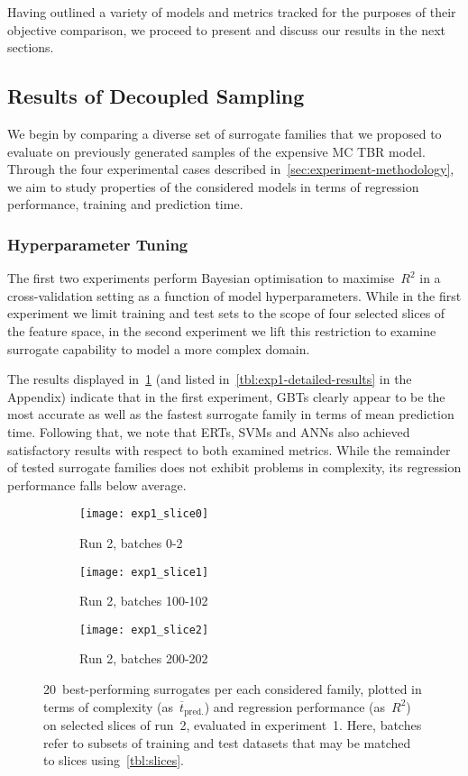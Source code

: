 Having outlined a variety of models and metrics tracked for the
purposes of their objective comparison, we proceed to present and discuss our
results in the next sections.


\subsection{Results of Decoupled Sampling}
\label{sec:modelres}

We begin by comparing a diverse set of surrogate families that we proposed
to evaluate on previously generated samples of the expensive MC TBR model.
Through the four experimental cases described
in~\cref{sec:experiment-methodology}, we aim to study properties of the
considered models in terms of regression performance, training and prediction
time.


\subsubsection{Hyperparameter Tuning}

The first two experiments perform Bayesian optimisation to maximise~$R^2$ in
a cross-validation setting as a function of model hyperparameters. While in the
first experiment we limit training and test sets to the scope of four selected
slices of the feature space, in the second experiment we lift this restriction
to examine surrogate capability to model a more complex domain.

The results displayed in~\cref{fig:exp1-time-vs-reg} (and listed
in~\cref{tbl:exp1-detailed-results} in the Appendix) indicate that in the first
experiment, GBTs clearly appear to be the most accurate as
well as the fastest surrogate family in terms of mean prediction time. Following
that, we note that ERTs, SVMs and ANNs also achieved satisfactory results with respect to both examined metrics.
While the remainder of tested surrogate families does not exhibit problems in
complexity, its regression performance falls below average.

\begin{figure}[h]
	\centering
	\begin{subfigure}[b]{0.333\textwidth}
		\centering
		\texttt{[image: exp1\_slice0]}
		\caption{Run 2, batches 0-2}
	\end{subfigure}\hfill%
	\begin{subfigure}[b]{0.333\textwidth}
		\centering
		\texttt{[image: exp1\_slice1]}
		\caption{Run 2, batches 100-102}
	\end{subfigure}\hfill%
	\begin{subfigure}[b]{0.333\textwidth}
		\centering
		\texttt{[image: exp1\_slice2]}
		\caption{Run 2, batches 200-202}
	\end{subfigure}
	\caption{20~best-performing surrogates per each considered family, plotted in
		terms of complexity (as~$\overline{t}_{\text{pred.}}$) and regression
		performance (as~$R^2$) on selected slices of run~2, evaluated in
	experiment~1. Here, batches refer to subsets of training and test datasets that
	may be matched to slices using~\cref{tbl:slices}.}
	\label{fig:exp1-time-vs-reg}
\end{figure}

